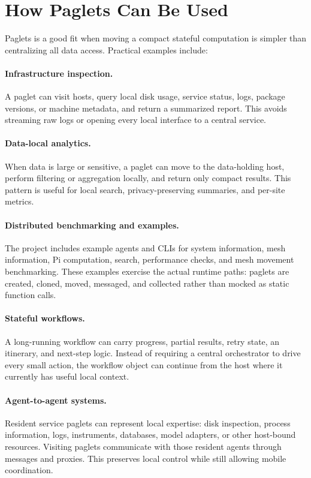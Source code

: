 \documentclass[11pt,a4paper]{article}
\begin{document}
\section{How Paglets Can Be Used}

Paglets is a good fit when moving a compact stateful computation is simpler
than centralizing all data access. Practical examples include:

\paragraph{Infrastructure inspection.}
A paglet can visit hosts, query local disk usage, service status, logs, package
versions, or machine metadata, and return a summarized report. This avoids
streaming raw logs or opening every local interface to a central service.

\paragraph{Data-local analytics.}
When data is large or sensitive, a paglet can move to the data-holding host,
perform filtering or aggregation locally, and return only compact results. This
pattern is useful for local search, privacy-preserving summaries, and
per-site metrics.

\paragraph{Distributed benchmarking and examples.}
The project includes example agents and CLIs for system information, mesh
information, Pi computation, search, performance checks, and mesh movement
benchmarking. These examples exercise the actual runtime paths: paglets are
created, cloned, moved, messaged, and collected rather than mocked as static
function calls.

\paragraph{Stateful workflows.}
A long-running workflow can carry progress, partial results, retry state, an
itinerary, and next-step logic. Instead of requiring a central orchestrator to
drive every small action, the workflow object can continue from the host where
it currently has useful local context.

\paragraph{Agent-to-agent systems.}
Resident service paglets can represent local expertise: disk inspection,
process information, logs, instruments, databases, model adapters, or other
host-bound resources. Visiting paglets communicate with those resident agents
through messages and proxies. This preserves local control while still allowing
mobile coordination.
\end{document}
